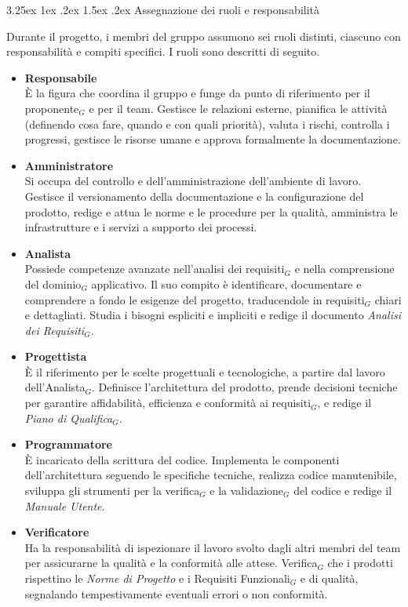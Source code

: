 \documentclass[a4paper, 10pt]{article}
\makeatletter
\renewcommand\paragraph{\@startsection{paragraph}{4}{\z@}%
  {3.25ex \@plus1ex \@minus .2ex}%
  {1.5ex \@plus .2ex}%
  {\normalfont\normalsize\bfseries}}
\makeatother
\begin{document}
\paragraph{Assegnazione dei ruoli e responsabilità}

Durante il progetto, i membri del gruppo assumono sei ruoli distinti, ciascuno con responsabilità e compiti specifici. I ruoli sono descritti di seguito.

\begin{itemize}
    \item \textbf{Responsabile}\\
    È la figura che coordina il gruppo e funge da punto di riferimento per il proponente$_G$ e per il team. Gestisce le relazioni esterne, pianifica le attività (definendo cosa fare, quando e con quali priorità), valuta i rischi, controlla i progressi, gestisce le risorse umane e approva formalmente la documentazione.

    \item \textbf{Amministratore}\\
    Si occupa del controllo e dell'amministrazione dell'ambiente di lavoro. Gestisce il versionamento della documentazione e la configurazione del prodotto, redige e attua le norme e le procedure per la qualità, amministra le infrastrutture e i servizi a supporto dei processi.

    \item \textbf{Analista}\\
    Possiede competenze avanzate nell'analisi dei requisiti$_G$ e nella comprensione del dominio$_G$ applicativo. Il suo compito è identificare, documentare e comprendere a fondo le esigenze del progetto, traducendole in requisiti$_G$ chiari e dettagliati. Studia i bisogni espliciti e impliciti e redige il documento \emph{Analisi dei Requisiti}$_G$.

    \item \textbf{Progettista}\\
    È il riferimento per le scelte progettuali e tecnologiche, a partire dal lavoro dell'Analista$_G$. Definisce l'architettura del prodotto, prende decisioni tecniche per garantire affidabilità, efficienza e conformità ai requisiti$_G$, e redige il \emph{Piano di Qualifica}$_G$.

    \item \textbf{Programmatore}\\
    È incaricato della scrittura del codice. Implementa le componenti dell'architettura seguendo le specifiche tecniche, realizza codice manutenibile, sviluppa gli strumenti per la verifica$_G$ e la validazione$_G$ del codice e redige il \emph{Manuale Utente}.

    \item \textbf{Verificatore}\\
    Ha la responsabilità di ispezionare il lavoro svolto dagli altri membri del team per assicurarne la qualità e la conformità alle attese. Verifica$_G$ che i prodotti rispettino le \emph{Norme di Progetto} e i Requisiti Funzionali$_G$ e di qualità, segnalando tempestivamente eventuali errori o non conformità.
\end{itemize}
\end{document}
